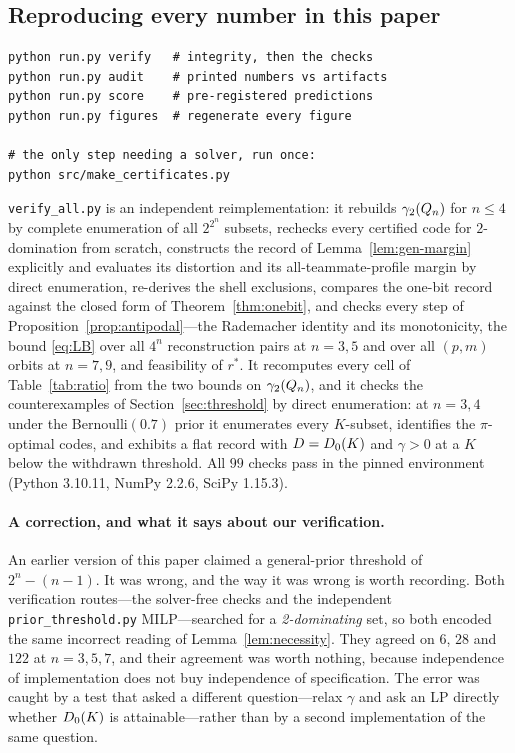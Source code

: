 \subsection{Reproducing every number in this paper}
\label{app:repro}

\begin{verbatim}
python run.py verify   # integrity, then the checks
python run.py audit    # printed numbers vs artifacts
python run.py score    # pre-registered predictions
python run.py figures  # regenerate every figure

# the only step needing a solver, run once:
python src/make_certificates.py
\end{verbatim}

\noindent
\texttt{verify\_all.py} is an independent reimplementation: it rebuilds
$\gamma_2(Q_n)$ for $n \le 4$ by complete enumeration of all $2^{2^n}$ subsets,
rechecks every certified code for $2$-domination from scratch, constructs the
record of Lemma~\ref{lem:gen-margin} explicitly and evaluates its distortion and
its all-teammate-profile margin by direct enumeration, re-derives the shell
exclusions, compares the one-bit record against the closed form of
Theorem~\ref{thm:onebit}, and checks every step of
Proposition~\ref{prop:antipodal}---the Rademacher identity and its monotonicity,
the bound \eqref{eq:LB} over all $4^n$ reconstruction pairs at $n = 3,5$ and over
all $(p,m)$ orbits at $n = 7,9$, and feasibility of $r^\ast$. It recomputes every
cell of Table~\ref{tab:ratio} from the two bounds on $\gamma_2(Q_n)$, and it checks
the counterexamples of Section~\ref{sec:threshold} by direct enumeration: at
$n = 3,4$ under the Bernoulli$(0.7)$ prior it enumerates every $K$-subset,
identifies the $\pi$-optimal codes, and exhibits a flat record with
$D = D_0(K)$ and $\gamma > 0$ at a $K$ below the withdrawn threshold. All $99$ checks pass in the pinned environment (Python 3.10.11, NumPy 2.2.6, SciPy
1.15.3).

\paragraph{A correction, and what it says about our verification.}
An earlier version of this paper claimed a general-prior threshold of
$2^n - (n-1)$. It was wrong, and the way it was wrong is worth recording. Both
verification routes---the solver-free checks and the independent
\texttt{prior\_threshold.py} MILP---searched for a \emph{2-dominating} set, so
both encoded the same incorrect reading of Lemma~\ref{lem:necessity}. They
agreed on $6$, $28$ and $122$ at $n = 3,5,7$, and their agreement was worth
nothing, because independence of implementation does not buy independence of
specification. The error was caught by a test that asked a different
question---relax $\gamma$ and ask an LP directly whether $D_0(K)$ is
attainable---rather than by a second implementation of the same question.

